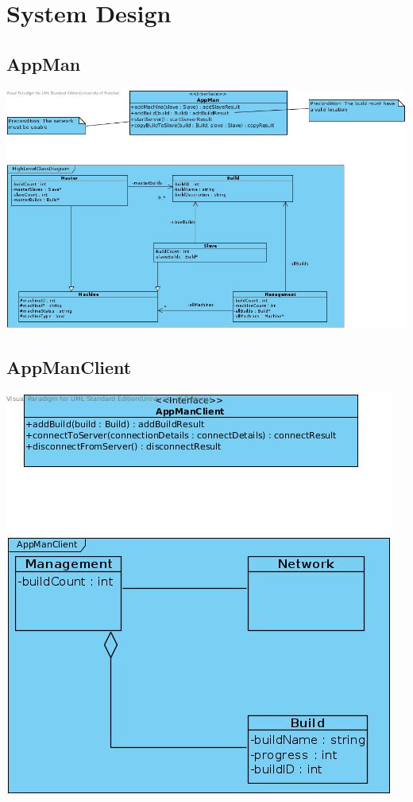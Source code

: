 \documentclass[a4paper,12pt,final]{article}
\begin{document}
\section{System Design}
\subsection{AppMan}

\begin{center}
\includegraphics[scale=0.5]{AppManDiagram.jpg} 
\end{center}

\subsection{AppManClient}

\begin{center}
\includegraphics[scale=0.5]{AppManClientDiagram.jpg} 
\end{center}
\end{document}
